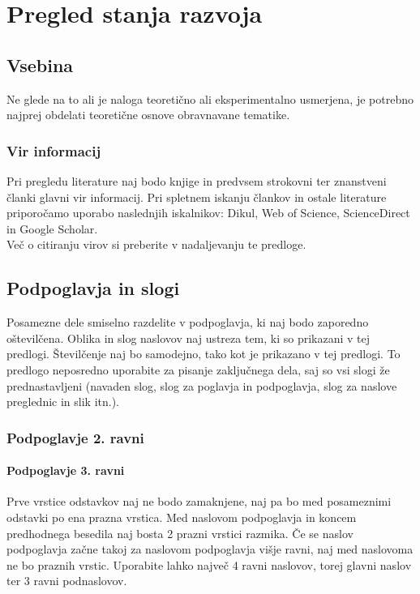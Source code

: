 \chapter{Pregled stanja razvoja}\label{cha:pregled_stanja}

\section{Vsebina}\label{sec:vsebina}
Ne glede na to ali je naloga teoretično ali eksperimentalno usmerjena, je potrebno najprej obdelati teoretične osnove obravnavane tematike.

\subsection{Vir informacij}\label{sec:vir_informacij}
Pri pregledu literature naj bodo knjige in predvsem strokovni ter znanstveni članki glavni vir informacij. Pri spletnem iskanju člankov in ostale literature priporočamo uporabo naslednjih iskalnikov: Dikul, Web of Science, ScienceDirect in Google Scholar.\\

Več o citiranju virov si preberite v nadaljevanju te predloge.

\section{Podpoglavja in slogi}\label{sec:podpoglavja}
Posamezne dele smiselno razdelite v podpoglavja, ki naj bodo zaporedno oštevilčena. Oblika in slog naslovov naj ustreza tem, ki so prikazani v tej predlogi. Številčenje naj bo samodejno, tako kot je prikazano v tej predlogi. To predlogo neposredno uporabite za pisanje zaključnega dela, saj so vsi slogi že prednastavljeni (navaden slog, slog za poglavja in podpoglavja, slog za naslove preglednic in slik itn.).

\subsection{Podpoglavje 2. ravni}\label{sec:poglavje_2}
\subsubsection{Podpoglavje 3. ravni}\label{sec:poglavje_3}

Prve vrstice odstavkov naj ne bodo zamaknjene, naj pa bo med posameznimi odstavki po ena prazna vrstica. Med naslovom podpoglavja in koncem predhodnega besedila naj bosta 2 prazni vrstici razmika. Če se naslov podpoglavja začne takoj za naslovom podpoglavja višje ravni, naj med naslovoma ne bo praznih vrstic. Uporabite lahko največ 4 ravni naslovov, torej glavni naslov ter 3 ravni podnaslovov.\\

